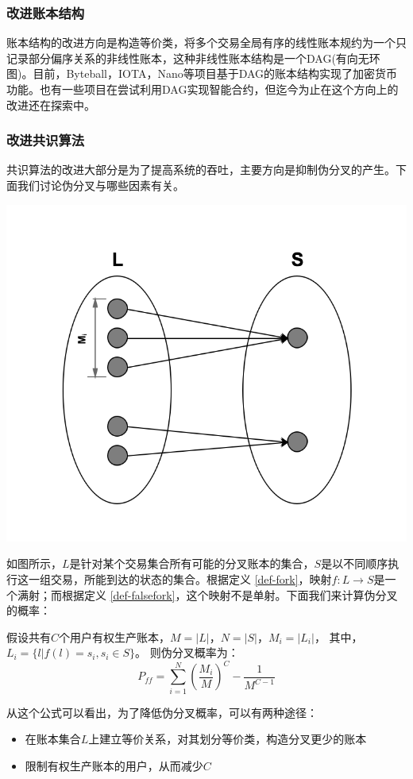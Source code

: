\documentclass[UTF8,nofonts]{ctexart}
\begin{document}
\begin{multicols}{2}
\subsubsection{改进账本结构}
账本结构的改进方向是构造等价类，将多个交易全局有序的线性账本规约为一个只记录部分偏序关系的非线性账本，这种非线性账本结构是一个DAG(有向无环图)。目前，Byteball\cite{byteball}，IOTA\cite{iota}，Nano\cite{nano}等项目基于DAG的账本结构实现了加密货币功能。也有一些项目在尝试利用DAG实现智能合约，但迄今为止在这个方向上的改进还在探索中。

\subsubsection{改进共识算法}
共识算法的改进大部分是为了提高系统的吞吐，主要方向是抑制伪分叉的产生。下面我们讨论伪分叉与哪些因素有关。

\includegraphics[width=.8\linewidth]{image/falsefork.png}

如图所示，$L$是针对某个交易集合所有可能的分叉账本的集合，$S$是以不同顺序执行这一组交易，所能到达的状态的集合。根据定义 \ref{def-fork}，映射$f: L \rightarrow S$是一个满射；而根据定义 \ref{def-falsefork}，这个映射不是单射。下面我们来计算伪分叉的概率：

假设共有$C$个用户有权生产账本，$M = \vert L \vert$，$N = \vert S \vert$，$M_{i} = \vert L_{i} \vert$， 其中，$L_{i} = \lbrace l \vert f(l) = s_{i}, s_{i} \in S \rbrace$。
则伪分叉概率为：
\begin{equation}
P_{ff} = \sum_{i=1}^{N}\left ( \frac{M_{i}}{M} \right )^{C} - \frac{1}{M^{C-1}}
\end{equation}

从这个公式可以看出，为了降低伪分叉概率，可以有两种途径：
\begin{itemize}
	\item 在账本集合$L$上建立等价关系，对其划分等价类，构造分叉更少的账本
	\item 限制有权生产账本的用户，从而减少$C$
\end{itemize}


\end{multicols}
\end{document}
